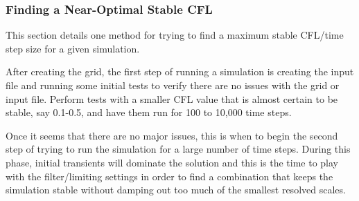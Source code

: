 
\subsubsection{Finding a Near-Optimal Stable CFL}%
\label{SEC:Time:Controlling:OptimizingCFL}


This section details one method for trying to find a maximum stable
CFL\slash time step size for a given simulation.


After creating the grid, the first step of running a simulation is creating the
input file and running some initial tests to verify there are no issues with the
grid or input file.
%
Perform tests with a smaller CFL value that is almost certain to be stable, say
0.1-0.5, and have them run for 100 to 10,000 time steps.


Once it seems that there are no major issues, this is when to begin the second
step of trying to run the simulation for a large number of time steps.
%
During this phase, initial transients will dominate the solution and this is the
time to play with the filter\slash limiting settings in order to find a
combination that keeps the simulation stable without damping out too much of the
smallest resolved scales.


